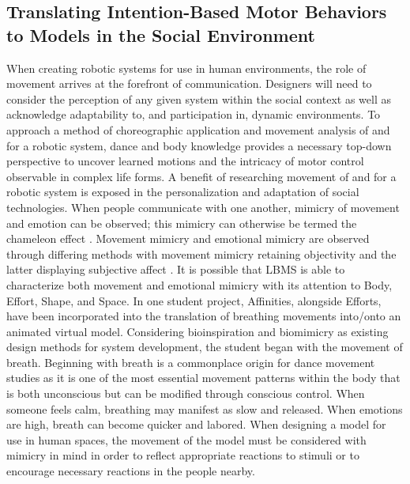 \documentclass[arts,article,submit,moreauthors,pdftex,10pt,a4paper]{mdpi}
\begin{document}
\subsection{Translating Intention-Based Motor Behaviors to Models in the Social Environment}

	When creating robotic systems for use in human environments, the role of movement arrives at the forefront of communication. Designers will need to consider the perception of any given system within the social context as well as acknowledge adaptability to, and participation in, dynamic environments. To approach a method of choreographic application and movement analysis of and for a robotic system, dance and body knowledge provides a necessary top-down perspective to uncover learned motions and the intricacy of motor control observable in complex life forms.
	A benefit of researching movement of and for a robotic system is exposed in the personalization and adaptation of social technologies. When people communicate with one another, mimicry of movement and emotion can be observed; this mimicry can otherwise be termed the chameleon effect \cite{lakin2003chameleon,chartrand1999chameleon}. Movement mimicry and emotional mimicry are observed through differing methods with movement mimicry retaining objectivity and the latter displaying subjective affect \cite{hess2013emotional}. It is possible that LBMS is able to characterize both movement and emotional mimicry with its attention to Body, Effort, Shape, and Space. In one student project, Affinities, alongside Efforts, have been incorporated into the translation of breathing movements into/onto an animated virtual model.
	Considering bioinspiration and biomimicry as existing design methods for system development, the student began with the movement of breath. Beginning with breath is a commonplace origin for dance movement studies as it is one of the most essential movement patterns within the body that is both unconscious but can be modified through conscious control. When someone feels calm, breathing may manifest as slow and released. When emotions are high, breath can become quicker and labored. When designing a model for use in human spaces, the movement of the model must be considered with mimicry in mind in order to reflect appropriate reactions to stimuli or to encourage necessary reactions in the people nearby.
\end{document}
